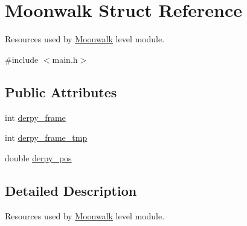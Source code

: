 \hypertarget{structMoonwalk}{\section{Moonwalk Struct Reference}
\label{structMoonwalk}
}


Resources used by \hyperlink{structMoonwalk}{Moonwalk} level module.  




{\ttfamily \#include $<$main.\-h$>$}

\subsection*{Public Attributes}
\begin{DoxyCompactItemize}
\item 
int \hyperlink{structMoonwalk_a4a3874c58e11745d4896b004861e1555}{derpy\-\_\-frame}
\item 
int \hyperlink{structMoonwalk_ab087ba01cd2a107286ec8f75f58c676c}{derpy\-\_\-frame\-\_\-tmp}
\item 
double \hyperlink{structMoonwalk_a69689c77a64928bfb52c1dc1e1f7b33f}{derpy\-\_\-pos}
\end{DoxyCompactItemize}


\subsection{Detailed Description}
Resources used by \hyperlink{structMoonwalk}{Moonwalk} level module. 


